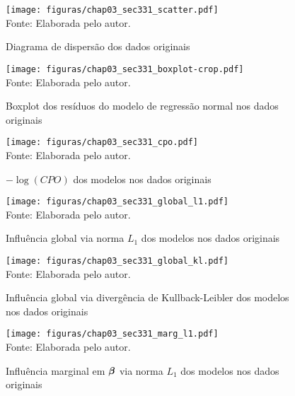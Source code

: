 \begin{figure}[H]
\begin{center}
\caption{Diagrama de dispersão dos dados originais}
\label{fig:chap03_sec331_scatter}
\texttt{[image: figuras/chap03\_sec331\_scatter.pdf]}
\\ Fonte: Elaborada pelo autor.
\end{center}
\end{figure}

\begin{figure}[H]
\begin{center}
\caption{Boxplot dos resíduos do modelo de regressão normal nos dados originais}
\label{fig:chap03_sec331_boxplot}
\texttt{[image: figuras/chap03\_sec331\_boxplot-crop.pdf]}
\\ Fonte: Elaborada pelo autor.
\end{center}
\end{figure}

\begin{figure}[H]
\begin{center}
\caption{$-\log(CPO)$ dos modelos nos dados originais}
\label{fig:chap03_sec331_cpo}
\texttt{[image: figuras/chap03\_sec331\_cpo.pdf]}
\\ Fonte: Elaborada pelo autor.
\end{center}
\end{figure}

\begin{figure}[H]
\begin{center}
\caption{Influência global via norma $L_1$ dos modelos nos dados originais}
\label{fig:chap03_sec331_global_l1}
\texttt{[image: figuras/chap03\_sec331\_global\_l1.pdf]}
\\ Fonte: Elaborada pelo autor.
\end{center}
\end{figure}

\begin{figure}[H]
\begin{center}
\caption{Influência global via divergência de Kullback-Leibler dos modelos nos dados originais}
\label{fig:chap03_sec331_global_kl}
\texttt{[image: figuras/chap03\_sec331\_global\_kl.pdf]}
\\ Fonte: Elaborada pelo autor.
\end{center}
\end{figure}

\begin{figure}[H]
\begin{center}
\caption{Influência marginal em ${\boldsymbol{\beta}}$ via norma $L_1$ dos modelos nos dados originais}
\label{fig:chap03_sec331_marg_l1}
\texttt{[image: figuras/chap03\_sec331\_marg\_l1.pdf]}
\\ Fonte: Elaborada pelo autor.
\end{center}
\end{figure}

